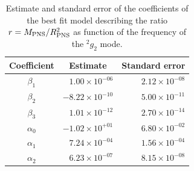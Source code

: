 

\begin{table}[h]

  \begin{tabular}{crr}
    \hline
    Coefficient & \multicolumn{1}{c}{Estimate} & Standard error \\
    \hline
   $\beta_1$  &  $ 1.00 \times 10^{-06}$ & $2.12 \times 10^{-08}$ \\   
   $\beta_2$  &  $-8.22 \times 10^{-10}$ & $5.00 \times 10^{-11}$ \\
   $\beta_3$  &  $ 1.01 \times 10^{-12}$ & $2.70 \times 10^{-14}$ \\
   $\alpha_0$ &  $-1.02 \times 10^{+01}$ & $6.80 \times 10^{-02}$ \\
   $\alpha_1$ &  $ 7.24 \times 10^{-04}$ & $1.56 \times 10^{-04}$ \\
   $\alpha_2$ &  $ 6.23 \times 10^{-07}$ & $8.15 \times 10^{-08}$ \\   
    \hline
  \end{tabular}
\caption{Estimate and standard error of the coefficients of the best fit model describing the ratio $r=M_{\rm PNS}/R_{\rm PNS}^2$ as function of the frequency of the $\mbox{}^2g_2$ mode.}\label{tab:model}
\end{table}

